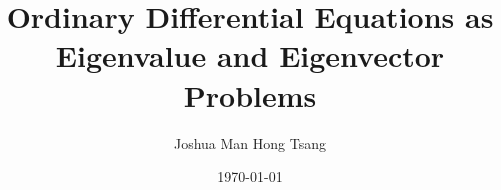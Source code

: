 \documentclass[a4paper,11pt,landscape]{article}
\title{Ordinary Differential Equations as Eigenvalue and Eigenvector Problems}
\author{Joshua Man Hong Tsang}
\date{\today}
\begin{document}
\maketitle
\tableofcontents

\begin{abstract}
\end{abstract}

\section{}
\end{document}
